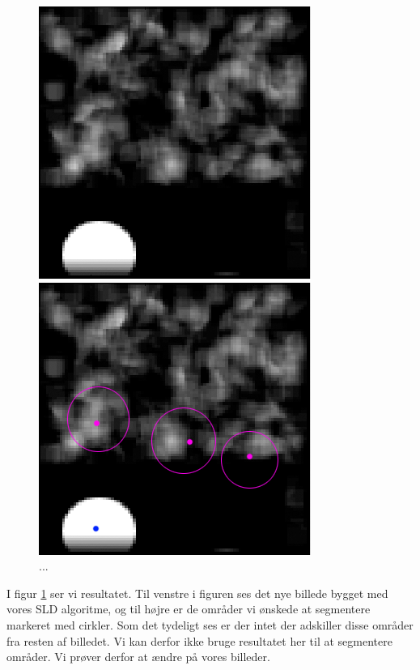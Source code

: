 \begin{figure}[H]
	\begin{minipage}[b]{0.5\linewidth}
		\centering
		\includegraphics[scale=0.54]{files/postmethod/img/sld_res2.png}
	\end{minipage}
	\hspace{0.8cm}
	\begin{minipage}[b]{0.5\linewidth}
		\centering
		\includegraphics[scale=0.54]{files/postmethod/img/sld_res22.png}
	\end{minipage}
	\caption{...\label{fig:postmethod_sld_res22}}
\end{figure}

I figur \ref{fig:postmethod_sld_res22} ser vi resultatet. Til venstre i figuren ses det nye billede bygget med vores SLD algoritme, og til højre er de områder vi ønskede at segmentere markeret med cirkler. Som det tydeligt ses er der intet der adskiller disse områder fra resten af billedet. Vi kan derfor ikke bruge resultatet her til at segmentere områder. Vi prøver derfor at ændre på vores billeder.

